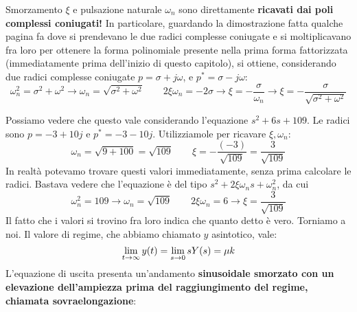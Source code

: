 \begin{defin}{}{}
Smorzamento $\xi$ e pulsazione naturale $\omega_n$ sono direttamente \textbf{ricavati dai poli complessi coniugati!} In particolare, guardando la dimostrazione fatta qualche pagina fa dove si prendevano le due radici complesse coniugate e si moltiplicavano fra loro per ottenere la forma polinomiale presente nella prima forma fattorizzata (immediatamente prima dell'inizio di questo capitolo), si ottiene, considerando due radici complesse coniugate $p = \sigma + j\omega$, e $p^* = \sigma - j\omega$: 
\begin{equation}
 \omega_n^2 = \sigma^2 + \omega^2 \rightarrow \boxed{\omega_n = \sqrt{\sigma^2 + \omega^2}} \quad \quad 2\xi \omega_{n} = -2\sigma \rightarrow \xi = -\frac{\sigma}{\omega_n} \rightarrow \boxed{\xi = -\frac{\sigma}{\sqrt{\sigma^2+\omega^2}}}
\end{equation}
\end{defin}
Possiamo vedere che questo vale considerando l'equazione $s^2 + 6s + 109$. Le radici sono $p = -3 + 10j$ e $p^* = -3 -10 j$. Utilizziamole per ricavare $\xi, \omega_n$:
\begin{equation*}
\omega_n = \sqrt{9+100} = \sqrt{109} \quad \quad \xi = -\frac{(-3)}{\sqrt{109}} = \frac{3}{\sqrt{109}}
\end{equation*}
In realtà potevamo trovare questi valori immediatamente, senza prima calcolare le radici. Bastava vedere che l'equazione è del tipo $s^2 + 2\xi\omega_n s + \omega_n^2$, da cui
\begin{equation*}
\omega_n^2 = 109 \rightarrow \omega_n = \sqrt{109} \quad \quad 2\xi\omega_n = 6 \rightarrow \xi = \frac{3}{\sqrt{109}}
\end{equation*}
Il fatto che i valori si trovino fra loro indica che quanto detto è vero.
\starbreak
Torniamo a noi.
Il valore di regime, che abbiamo chiamato $y$ asintotico, vale:
\begin{equation}
\lim_{t \rightarrow \infty} y(t) = \lim_{s \rightarrow 0} sY(s) = \mu k
\end{equation}
L'equazione di uscita presenta un'andamento \textbf{sinusoidale smorzato con un elevazione dell'ampiezza prima del raggiungimento del regime, chiamata sovraelongazione}:
\newpage
